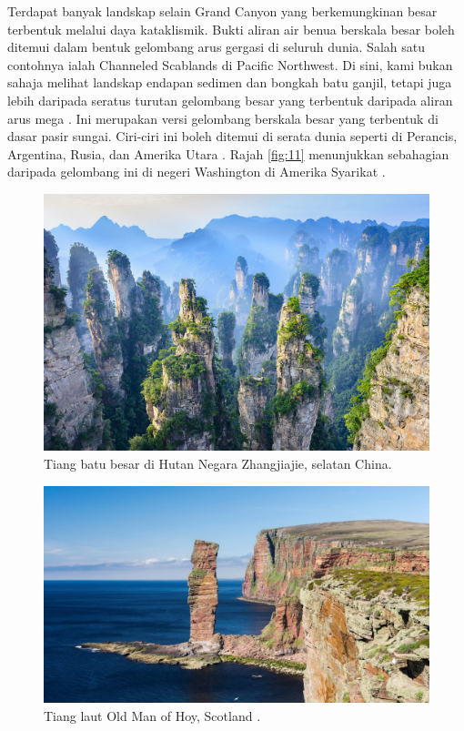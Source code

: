 \documentclass[10pt,twocolumn,letterpaper]{article}
\begin{document}
Terdapat banyak landskap selain Grand Canyon yang berkemungkinan besar terbentuk melalui daya kataklismik. Bukti aliran air benua berskala besar boleh ditemui dalam bentuk gelombang arus gergasi di seluruh dunia. Salah satu contohnya ialah Channeled Scablands di Pacific Northwest. Di sini, kami bukan sahaja melihat landskap endapan sedimen dan bongkah batu ganjil, tetapi juga lebih daripada seratus turutan gelombang besar yang terbentuk daripada aliran arus mega \cite{78,79}. Ini merupakan versi gelombang berskala besar yang terbentuk di dasar pasir sungai. Ciri-ciri ini boleh ditemui di serata dunia seperti di Perancis, Argentina, Rusia, dan Amerika Utara \cite{81}. Rajah \ref{fig:11} menunjukkan sebahagian daripada gelombang ini di negeri Washington di Amerika Syarikat \cite{80}.

\begin{figure}[b]
\begin{center}
   \includegraphics[width=1\linewidth]{zhangjiajie.jpg}
\end{center}
   \caption{Tiang batu besar di Hutan Negara Zhangjiajie, selatan China.}
\label{fig:12}
\label{fig:onecol}
\end{figure}

\begin{figure}[b]
\begin{center}
   \includegraphics[width=1\linewidth]{hoy.jpg}
\end{center}
   \caption{Tiang laut Old Man of Hoy, Scotland \cite{83}.}
\label{fig:13}
\label{fig:onecol}
\end{figure}
\end{document}

